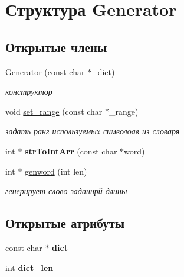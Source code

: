 \hypertarget{struct_generator}{}\section{Структура Generator}
\label{struct_generator}
\subsection*{Открытые члены}
\begin{DoxyCompactItemize}
\item 
\hyperlink{struct_generator_a9967a0cb13e43132978c35543c2bbc9d}{Generator} (const char $\ast$\+\_\+dict)
\begin{DoxyCompactList}\small\item\em конструктор \end{DoxyCompactList}\item 
void \hyperlink{struct_generator_ac7602c8323c11fb1248cf6c464b80a58}{set\+\_\+range} (const char $\ast$\+\_\+range)
\begin{DoxyCompactList}\small\item\em задать ранг используемых символоав из словаря \end{DoxyCompactList}\item 
\mbox{\label{struct_generator_af8fddf9b2176c7f5b25fdc5c11b5c91e}} 
int $\ast$ {\bfseries str\+To\+Int\+Arr} (const char $\ast$word)
\item 
\mbox{\label{struct_generator_ad808c2803bf926dd59bdd11db13ef7b1}} 
int $\ast$ \hyperlink{struct_generator_ad808c2803bf926dd59bdd11db13ef7b1}{genword} (int len)
\begin{DoxyCompactList}\small\item\em генерирует слово заданнрй длины \end{DoxyCompactList}\end{DoxyCompactItemize}
\subsection*{Открытые атрибуты}
\begin{DoxyCompactItemize}
\item 
\mbox{\label{struct_generator_ad274dacd29666ce67d29fcb01d91cd5f}} 
const char $\ast$ {\bfseries dict}
\item 
\mbox{\label{struct_generator_a7c59267af41502a76b0d0ecd60330939}} 
int {\bfseries dict\+\_\+len}
\end{DoxyCompactItemize}


